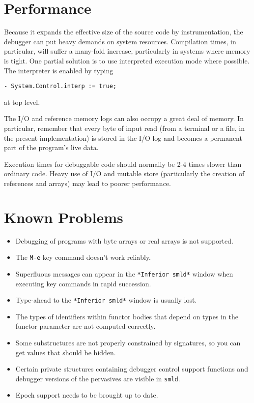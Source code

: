 \section{Performance}
\label{sec:performance}
Because it expands the effective size of the source code by instrumentation,
the debugger can put heavy demands on system resources.  Compilation times,
in particular, will suffer a many-fold increase, particularly in systems
where memory is tight.  One partial solution is to use interpreted execution 
mode where possible.  The interpreter is enabled by typing
\begin{verbatim}
- System.Control.interp := true;
\end{verbatim}
at top level.

The I/O and reference memory logs can also occupy a great deal of memory. In
particular, remember that every byte of input read (from a terminal or
a file, in the present implementation) is stored in the I/O log and 
becomes a permanent part of the program's live data.

Execution times for debuggable code should normally be 2-4 times slower than
ordinary code.  Heavy use of I/O and mutable store (particularly the creation
of references and arrays) may lead to poorer performance.

\section{Known Problems}
\label{sec:bugs}

\begin{itemize}
\item Debugging of programs with byte arrays or real arrays is not
supported.
\item The \verb'M-e' key command doesn't work reliably.
\item Superfluous messages can appear in the \verb'*Inferior smld*' window 
when executing key commands in rapid succession.
\item Type-ahead to the \verb'*Inferior smld*' window is usually lost.
\item The types of identifiers within functor bodies that depend on 
types in the functor parameter are not computed correctly.
\item Some substructures are not properly constrained by signatures, so
you can get values that should be hidden.
\item Certain private 
structures containing debugger control support functions and
debugger versions of the pervasives are visible in {\tt smld}.
\item Epoch support needs to be brought up to date.
\end{itemize}

